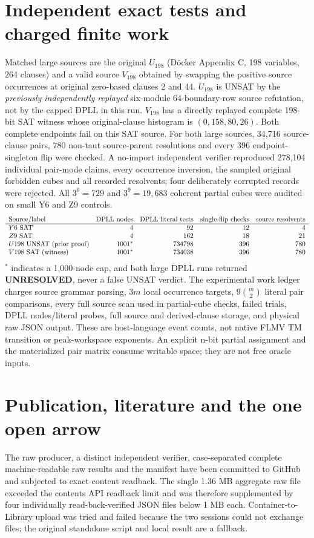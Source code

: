 \documentclass[11pt]{article}
\begin{document}
\section{Independent exact tests and charged finite work}
Matched large sources are the original $U_{198}$
(D\"ocker Appendix C, 198 variables, 264 clauses) and a
valid source $V_{198}$ obtained by swapping the positive
source occurrences at original zero-based clauses 2 and 44.
$U_{198}$ is UNSAT by the \emph{previously independently
replayed} six-module 64-boundary-row source refutation,
not by the capped DPLL in this run.
$V_{198}$ has a directly replayed complete 198-bit SAT witness
whose original-clause histogram is $(0,158,80,26)$.
Both complete endpoints fail on this SAT source.
For both large sources, 34,716 source-clause pairs,
780 non-taut source-parent resolutions and every
396 endpoint-singleton flip were checked.
A no-import independent verifier reproduced 278,104
individual pair-mode claims, every occurrence inversion,
the sampled original forbidden cubes and all recorded
resolvents; four deliberately corrupted records were rejected.
All $3^6=729$ and $3^9=19,683$ coherent partial cubes
were audited on small Y6 and Z9 controls.
\[
\begin{array}{lrrrr}
\text{Source/label}&\text{DPLL nodes}&\text{DPLL literal tests}&
\text{single-flip checks}&\text{source resolvents}\\
\hline
Y6\ {\rm SAT}&4&92&12&4\\
Z9\ {\rm SAT}&4&162&18&21\\
U198\ {\rm UNSAT\ (prior\ proof)}&1001^*&734798&396&780\\
V198\ {\rm SAT\ (witness)}&1001^*&734038&396&780
\end{array}
\]
$^*$ indicates a 1,000-node cap, and both large DPLL runs
returned \textbf{UNRESOLVED}, never a false UNSAT verdict.
The experimental work ledger charges source grammar parsing,
$3m$ local occurrence targets, $9\binom m2$ literal pair
comparisons, every full source scan used in partial-cube
checks, failed trials, DPLL nodes/literal probes, full source
and derived-clause storage, and physical raw JSON output.
These are host-language event counts, not native FLMV TM
transition or peak-workspace exponents. An explicit n-bit
partial assignment and the materialized pair matrix consume
writable space; they are not free oracle inputs.

\section{Publication, literature and the one open arrow}
The raw producer, a distinct independent verifier,
case-separated complete machine-readable raw results and
the manifest have been committed to GitHub and subjected
to exact-content readback. The single 1.36 MB aggregate raw
file exceeded the contents API readback limit and was therefore
supplemented by four individually read-back-verified JSON
files below 1 MB each. Container-to-Library upload was tried
and failed because the two sessions could not exchange files;
the original standalone script and local result are a fallback.
\end{document}
